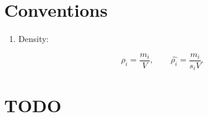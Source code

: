 \documentclass[a4paper,12pt]{article}
\begin{document}
\section{Conventions}

\begin{enumerate}

    \item Density:

        \[
            \rho_i = \frac{m_i}{V}, \qquad
            \hat{\rho_i} = \frac{m_i}{s_i V}
        .\] 

\end{enumerate}

\section{TODO}
\end{document}
